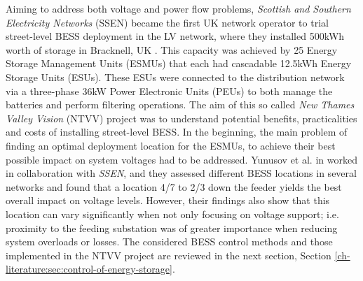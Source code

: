 Aiming to address both voltage and power flow problems, \textit{Scottish and Southern Electricity Networks} (SSEN) became the first UK network operator to trial street-level BESS deployment in the LV network, where they installed 500kWh worth of storage in Bracknell, UK \cite{SSEN2016}.
This capacity was achieved by 25 Energy Storage Management Units (ESMUs) that each had cascadable 12.5kWh Energy Storage Units (ESUs).
These ESUs were connected to the distribution network via a three-phase 36kW Power Electronic Units (PEUs) to both manage the batteries and perform filtering operations.
The aim of this so called \textit{New Thames Valley Vision} (NTVV) project was to understand potential benefits, practicalities and costs of installing street-level BESS.
In the beginning, the main problem of finding an optimal deployment location for the ESMUs, to achieve their best possible impact on system voltages had to be addressed.
Yunusov et al. in \cite{Yunusov2016} worked in collaboration with \textit{SSEN}, and they assessed different BESS locations in several networks and found that a location 4/7 to 2/3 down the feeder yields the best overall impact on voltage levels.
However, their findings also show that this location can vary significantly when not only focusing on voltage support; i.e. proximity to the feeding substation was of greater importance when reducing system overloads or losses.
The considered BESS control methods and those implemented in the NTVV project are reviewed in the next section, Section \ref{ch-literature:sec:control-of-energy-storage}.








